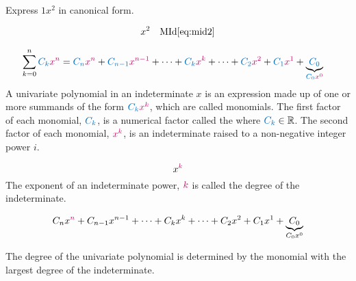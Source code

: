 \documentclass[20150903-160354-rs2.2-MarksMathNotebook.tex]{subfiles}
\begin{document}
\begin{example}[id:20141120-202842] \label{20141120-202842} \hfill \\

Express $1x^2$ in canonical form.

\soln

\solnsteps
\begin{align*}
x^2 && \text{MId} \eqref{eq:mid2}
\end{align*}
\end{example}

\begin{definition}
\begin{align}
\sum\limits_{k=0}^n \cBlue{C_{k}}\cRed{x^{n}} & = \cBlue{C_{n}}\cRed{x^{n}}+\cBlue{C_{n-1}}\cRed{x^{n-1}}+ \cdots + \cBlue{C_{k}}\cRed{x^{k}} + \cdots + \cBlue{C_{2}}\cRed{x^{2}}+\cBlue{C_{1}}\cRed{x^{1}}+\underbrace{\cBlue{C_{0}}}_{\cBlue{C_{0}}\cRed{x^{0}}}
\end{align}
A univariate polynomial in an indeterminate $x$ is an expression made up of one or more summands of the form $\cBlue{C_{k}}\cRed{x^{k}}$, which are called monomials.  The first factor of each monomial, $\cBlue{C_{k}}$, is a numerical factor called the  where $\cBlue{C_{k}} \in \real$. The second factor of each monomial, $\cRed{x^{k}}$, is an indeterminate raised to a non-negative integer power $i$.

\hfill \cite{wikipedia:polynomial}
\end{definition}

\begin{definition}

\[
x^{\cRed{k}}
\]
The exponent of an indeterminate power, $\cRed{k}$ is called the degree of the indeterminate.

\hfill \cite{wikipedia:polynomial}
\end{definition}

\begin{definition}

\[
C_{n}x^{\cRed{n}}+C_{n-1}x^{n-1}+ \cdots + C_{k}x^{k} + \cdots + C_{2}x^{2}+C_{1}x^{1}+\underbrace{C_{0}}_{C_{0}x^{0}}
\]

The degree of the univariate polynomial is determined by the monomial with the largest degree of the indeterminate.

\end{definition}
\end{document}

